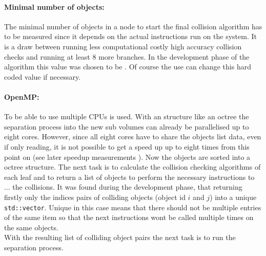 \paragraph{Minimal number of objects:}
The minimal number of objects in a node to start the final collision algorithm has to be measured since it depends on the actual instructions run on the system.
It is a draw between running less computational costly high accuracy collision checks and running at least 8 more branches.
In the development phase of the algorithm this value was chosen to be \dummy.
Of course the use can change this hard coded value if necessary. 
% 
\paragraph{OpenMP:}
To be able to use multiple \ac{CPU}s \openmp is used. With an structure like an octree the separation process into the new sub volumes can already be parallelised up to eight cores.
However, since all eight cores have to share the objects list data, even if only reading, it is not possible to get a speed up up to eight times from this point on (see later speedup measurements \dummy).
% 
Now the objects are sorted into a octree structure.
The next task is to calculate the collision checking algorithms of each leaf and to return a list of objects to perform the necessary instructions to ... the collisions.
It was found during the development phase, that returning firstly only the indices pairs of colliding objects (\eg object id $i$ and $j$) into a unique \texttt{std::vector}.
Unique in this case means that there should not be multiple entries of the same item so that the next instructions wont be called multiple times on the same objects.
\\[\baselineskip]
% 
With the resulting list of colliding object pairs the next task is to run the separation process.
%
